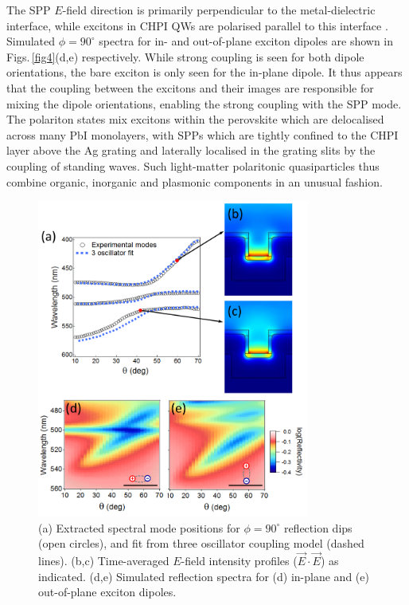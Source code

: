 The SPP $E$-field direction is primarily perpendicular to the metal-dielectric interface, while excitons in CHPI QWs are polarised parallel to this interface \cite{Pradeesh2009b, Mitzi2001b}.  Simulated $\phi=90^{\circ}$ spectra for in- and out-of-plane exciton dipoles are shown in Figs.\,\ref{fig4}(d,e) respectively. While strong coupling is seen for both dipole orientations, the bare exciton is only seen for the in-plane dipole. It thus appears that the coupling between the excitons and their images are responsible for mixing the dipole orientations, enabling the strong coupling with the SPP mode. The polariton states mix excitons within the perovskite which are delocalised across many PbI monolayers, with SPPs which are tightly confined to the CHPI layer above the Ag grating and laterally localised in the grating slits by the coupling of standing waves. Such light-matter polaritonic quasiparticles thus combine organic, inorganic and plasmonic components in an unusual fashion.
\begin{figure}[ht] 
\centering    
\includegraphics[width=0.8\textwidth]{Fig18}
\caption{(a) Extracted spectral mode positions for $\phi=90^{\circ}$ reflection dips (open circles), and fit from three oscillator coupling model (dashed lines). (b,c) Time-averaged $E$-field intensity profiles ($\vec{E}\cdot\vec{E}$) as indicated. (d,e) Simulated reflection spectra for (d) in-plane and (e) out-of-plane exciton dipoles.}
\label{7Fig18}
\end{figure}

